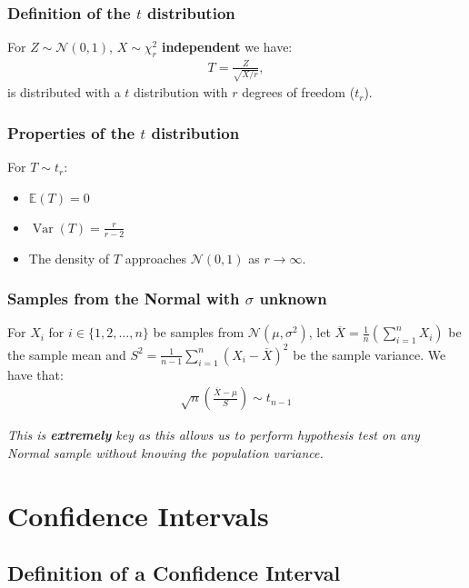 \documentclass[a4paper, 12pt, twoside]{article}
\DeclareMathOperator{\Var}{Var}
\begin{document}
\subsubsection{Definition of the $t$ distribution}

For $Z \sim \mathcal{N}(0, 1)$, $X \sim \chi^2_r$ \textbf{independent} we have:
\begin{align*}
    T = \frac{Z}{\sqrt{X / r}},
\end{align*}
is distributed with a $t$ distribution with $r$ degrees of freedom ($t_r$).

\subsubsection{Properties of the $t$ distribution}

For $T \sim t_r$:

\begin{itemize}
    \item $\mathbb{E}(T) = 0$
    \item $\Var(T) = \frac{r}{r - 2}$
    \item The density of $T$ approaches $\mathcal{N}(0, 1)$ as $r\to\infty$.
\end{itemize}

\subsubsection{Samples from the Normal with $\sigma$ unknown}

For $X_i$ for $i \in \{1, 2, \ldots, n\}$ be samples from
$\mathcal{N}(\mu, \sigma^2)$, let $\overline{X} = \frac{1}{n}
    (\sum_{i = 1}^n X_i)$ be the sample mean and $S^2 = \frac{1}{n - 1}
    \sum_{i = 1}^n(X_i - \overline{X})^2$ be the sample variance. We have that:
\begin{align*}
    \sqrt{n}\left(\frac{\overline{X} - \mu}{S}\right) \sim t_{n - 1}
\end{align*}

\textit{This is \textbf{extremely} key as this allows us to perform hypothesis
    test on any Normal sample without knowing the population variance.}

\newpage

\section{Confidence Intervals}

\subsection{Definition of a Confidence Interval}
\end{document}
